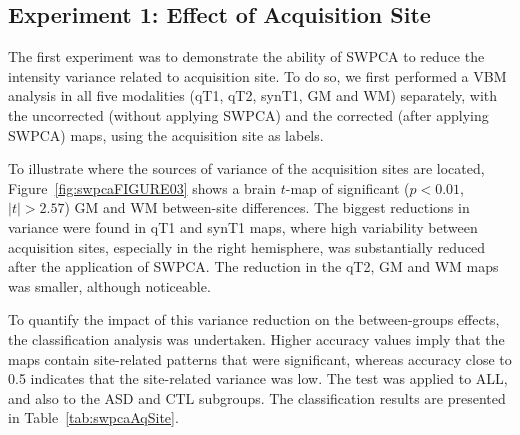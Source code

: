 \subsection{Experiment 1: Effect of Acquisition Site}\label{sec:swpcaE1}
The first experiment was to demonstrate the ability of SWPCA to reduce
the intensity variance related to acquisition site. To do so, we first
performed a \ac{VBM} analysis in all five modalities (\ac{qT1}, \ac{qT2}, \ac{synT1}, \ac{GM} and \ac{WM}) separately, with the uncorrected (without applying SWPCA) and
the corrected (after applying SWPCA) maps, using the acquisition site
as labels. 

To illustrate where the sources of variance of the acquisition sites are
located, Figure~\ref{fig:swpcaFIGURE03} shows a brain $t$-map of significant
($p<0.01$, $|t|>2.57$) \ac{GM} and \ac{WM}
between-site differences. The biggest reductions in variance were found
in \ac{qT1} and \ac{synT1} maps, where high variability between acquisition
sites, especially in the right hemisphere, was substantially reduced
after the application of \ac{SWPCA}. The reduction in the \ac{qT2}, \ac{GM} and \ac{WM}
maps was smaller, although noticeable. 

To quantify the impact of this variance reduction on the between-groups
effects, the classification analysis was undertaken. Higher accuracy
values imply that the maps contain site-related patterns that were
significant, whereas accuracy close to 0.5 indicates that the
site-related variance was low. The test was applied to ALL, and also to
the \ac{ASD} and CTL subgroups. The classification results are presented in
Table~\ref{tab:swpcaAqSite}. 
	
